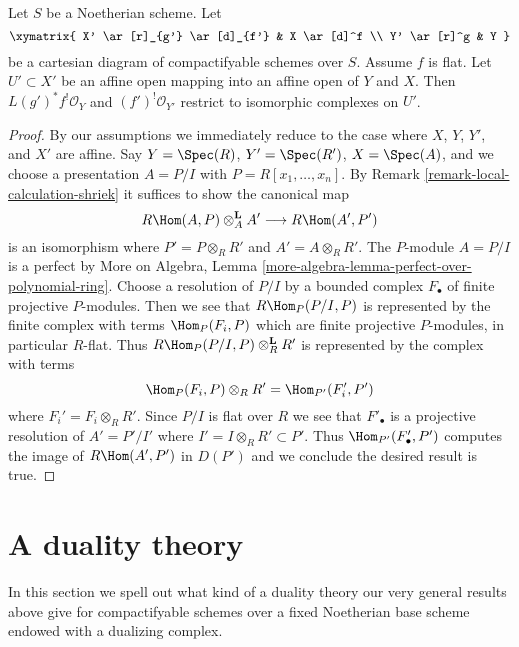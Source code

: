 \begin{lemma}
\label{lemma-base-change-locally}
Let $S$ be a Noetherian scheme. Let
$$
\xymatrix{
X' \ar[r]_{g'} \ar[d]_{f'} & X \ar[d]^f \\
Y' \ar[r]^g & Y
}
$$
be a cartesian diagram of compactifyable schemes over $S$.
Assume $f$ is flat.
Let $U' \subset X'$ be an affine open mapping into an affine
open of $Y$ and $X$. Then $L(g')^*f^!\mathcal{O}_Y$ and
$(f')^!\mathcal{O}_{Y'}$
restrict to isomorphic complexes on $U'$.
\end{lemma}

\begin{proof}
By our assumptions we immediately reduce to the case where
$X$, $Y$, $Y'$, and $X'$ are affine. Say $Y = \Spec(R)$,
$Y' = \Spec(R')$, $X = \Spec(A)$, and we choose a presentation
$A = P/I$ with $P = R[x_1, \ldots, x_n]$. By
Remark \ref{remark-local-calculation-shriek}
it suffices to show the canonical map
$$
R\Hom(A, P) \otimes_A^\mathbf{L} A'
\longrightarrow
R\Hom(A', P')
$$
is an isomorphism where $P' = P \otimes_R R'$ and $A' = A \otimes_R R'$.
The $P$-module $A = P/I$ is a perfect by
More on Algebra, Lemma \ref{more-algebra-lemma-perfect-over-polynomial-ring}.
Choose a resolution of $P/I$ by
a bounded complex $F_\bullet$ of finite projective $P$-modules.
Then we see that $R\Hom_P(P/I, P)$ is represented
by the finite complex with terms $\Hom_P(F_i, P)$ which are finite
projective $P$-modules, in particular $R$-flat. Thus
$R\Hom_P(P/I, P) \otimes_R^\mathbf{L} R'$
is represented by the complex with terms
$$
\Hom_P(F_i, P) \otimes_R R' = \Hom_{P'}(F_i', P')
$$
where $F_i' = F_i \otimes_R R'$. Since
$P/I$ is flat over $R$ we see that $F'_\bullet$ is a projective resolution
of $A' = P'/I'$ where $I' = I \otimes_R R' \subset P'$.
Thus $\Hom_{P'}(F'_\bullet, P')$ computes the image of
$R\Hom(A', P')$ in $D(P')$ and we conclude the desired
result is true.
\end{proof}









\section{A duality theory}
\label{section-duality}

\noindent
In this section we spell out what kind of a duality theory
our very general results above give for compactifyable schemes
over a fixed Noetherian base scheme endowed with a dualizing complex.

